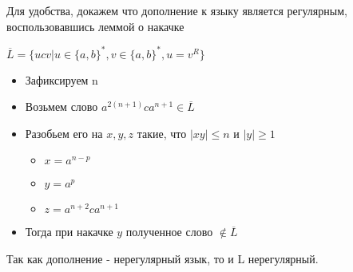 \documentclass[a4paper, 12pt]{article}
\begin{document}
\begin{description}
  \item [$L = \{a^kb^ma^n | k = n \lor m > 0\}$]
  
  \item [$L = \{ucv | u \in \{a, b\}^*, v \in \{a, b\}^*, u \neq v^R\}$]
  \item Для удобства, докажем что дополнение к языку является регулярным, воспользовавшись леммой о накачке
  \item $\overline{L} = \{ucv | u \in \{a, b\}^*, v \in \{a, b\}^*, u = v^R\}$
    \begin{itemize}
      \item Зафиксируем n
      \item Возьмем слово $a^{2(n+1)} c a^{n+1} \in \overline{L}$
      \item Разобьем его на $x,y,z$ такие, что $|xy| \leq n$ и $|y| \geq 1$
      \begin{itemize}
        \item $x=a^{n-p}$
        \item $y=a^p$
        \item $z=a^{n+2}ca^{n+1}$
      \end{itemize}
      \item Тогда при накачке $y$ полученное слово $\notin \overline{L}$ 
    \end{itemize}
  \item Так как дополнение - нерегулярный язык, то и L нерегулярный.

\end{description}
\end{document}
